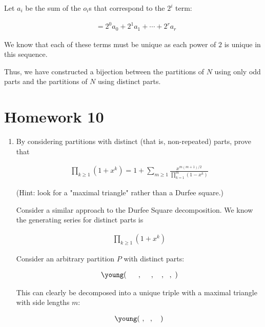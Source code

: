 \documentclass{report}
\begin{document}
{\begin{enumerate}
{              Let $a_i$ be the sum of the $o_i$s that correspond to the $2^i$ term:

              \begin{align*}
                   & = 2^0 a_0 + 2^1 a_1 + \cdots + 2^{r} a_r
              \end{align*}

              We know that each of these terms must be unique as each power of $2$ is unique in this sequence.

              Thus, we have constructed a bijection between the partitions of $N$ using only odd parts
              and the partitions of $N$ using distinct parts.
          }
\end{enumerate}

\section{Homework 10}

\begin{enumerate} %

    \item By considering partitions with distinct (that is, non-repeated) parts, prove that

          \begin{align*}
              \prod_{k\geq 1} (1+x^k)=1+\sum_{m\geq
                  1}\frac{x^{m(m+1)/2}}{\prod_{k=1}^m (1-x^k)}
          \end{align*}

          (Hint: look for a "maximal triangle" rather than a Durfee square.)

          Consider a similar approach to the Durfee Square decomposition. We know the generating series for distinct parts is

          \begin{align*}
              \prod_{k\ge 1}(1 + x^k)
          \end{align*}

          Consider an arbitrary partition $P$ with distinct parts:

          \begin{align*}
              \young(~~~~~,~~~~,~~~,~~,~)
          \end{align*}

          This can clearly be decomposed into a unique triple with a maximal triangle with side lengths $m$:

          \begin{multicols}{3}
              \begin{align*}
                  \young(~,~~,~~~)
              \end{align*}


\end{multicols}
\end{enumerate}}
\end{document}
